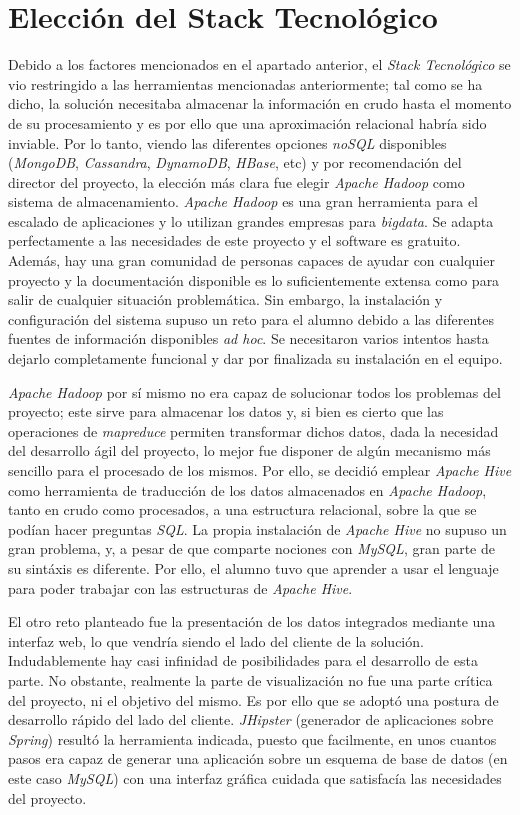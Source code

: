 \section{Elección del Stack Tecnológico}  \label{analisis.stack}
Debido a los factores mencionados en el apartado anterior, el \textit{Stack Tecnológico} se vio restringido a las herramientas mencionadas anteriormente; tal como se ha dicho, la solución necesitaba almacenar la información en crudo hasta el momento de su procesamiento y es por ello que una aproximación relacional habría sido inviable. Por lo tanto, viendo las diferentes opciones \textit{noSQL} disponibles (\textit{MongoDB}, \textit{Cassandra}, \textit{DynamoDB}, \textit{HBase}, etc) y por recomendación del director del proyecto, la elección más clara fue elegir \textit{Apache Hadoop} como sistema de almacenamiento. \textit{Apache Hadoop} es una gran herramienta para el escalado de aplicaciones y lo utilizan grandes empresas para \textit{\gls{bigdata}}. Se adapta perfectamente a las necesidades de este proyecto y el software es gratuito. Además, hay una gran comunidad de personas capaces de ayudar con cualquier proyecto y la documentación disponible es lo suficientemente extensa como para salir de cualquier situación problemática. Sin embargo, la instalación y configuración del sistema supuso un reto para el alumno debido a las diferentes fuentes de información disponibles \textit{ad hoc}. Se necesitaron varios intentos hasta dejarlo completamente funcional y dar por finalizada su instalación en el equipo. \par
\textit{Apache Hadoop} por sí mismo no era capaz de solucionar todos los problemas del proyecto; este sirve para almacenar los datos y, si bien es cierto que las operaciones de \textit{\gls{mapreduce}} permiten transformar dichos datos, dada la necesidad del desarrollo ágil del proyecto, lo mejor fue disponer de algún mecanismo más sencillo para el procesado de los mismos. Por ello, se decidió emplear \textit{Apache Hive} como herramienta de traducción de los datos almacenados en \textit{Apache Hadoop}, tanto en crudo como procesados, a una estructura relacional, sobre la que se podían hacer preguntas \textit{SQL}. La propia instalación de \textit{Apache Hive} no supuso un gran problema, y, a pesar de que comparte  nociones con \textit{MySQL}, gran parte de su sintáxis es diferente. Por ello, el alumno tuvo que aprender a usar el lenguaje para poder trabajar con las estructuras de \textit{Apache Hive}.\par
El otro reto planteado fue la presentación de los datos integrados mediante una interfaz web, lo que vendría siendo el lado del cliente de la solución. Indudablemente hay casi infinidad de posibilidades para el desarrollo de esta parte. No obstante, realmente la parte de visualización no fue una parte crítica del proyecto, ni el objetivo del mismo. Es por ello que se adoptó una postura de desarrollo rápido del lado del cliente. \textit{JHipster} (generador de aplicaciones sobre \textit{Spring}) resultó la herramienta indicada, puesto que facilmente, en unos cuantos pasos era capaz de generar una aplicación sobre un esquema de base de datos (en este caso \textit{MySQL}) con una interfaz gráfica cuidada que satisfacía las necesidades del proyecto. 

